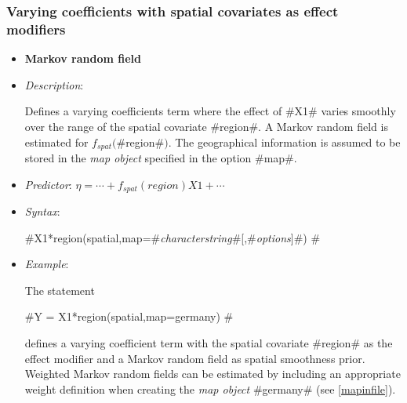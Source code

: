 \subsubsection*{Varying coefficients with spatial covariates as
effect modifiers}

\begin{itemize}
\item[]{\bf\sffamily Markov random field}

\item[] {\em Description}:

Defines a varying coefficients term where the effect of #X1#
varies smoothly over the range of the spatial covariate #region#.
A Markov random field is estimated for $f_{spat}($#region#$)$. The
geographical information is assumed to be stored in the {\em map
object} specified in the option #map#.

\item[] {\em Predictor}: $\eta = \cdots + f_{spat}(region)X1 +
\cdots$

\item[] {\em Syntax}:

#X1*region(spatial,map=#{\em characterstring}#[,#{\em options}]#) #
\item[] {\em Example}:

The statement

#Y = X1*region(spatial,map=germany) #

defines a varying coefficient term with the spatial covariate
#region# as the effect modifier and a Markov random field as spatial
smoothness prior. Weighted Markov random fields can be estimated by
including an appropriate weight definition when creating the {\em
map object} #germany# (see \autoref{mapinfile}).
\end{itemize}




